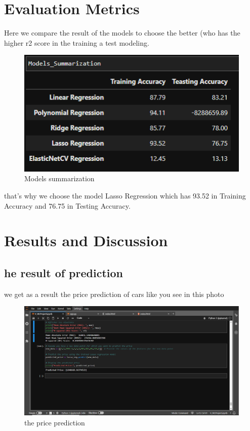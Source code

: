 \documentclass{article}
\begin{document}
\section{Evaluation Metrics}
Here we compare the result of the models to choose the better (who has the higher r2 score in the training a test modeling.

\begin{figure}[h]
    \centering
    \includegraphics[width=1\textwidth]{comparison.png}
    \caption{Models summarization}
    \label{fig:my_label}
\end{figure}

 that's why we choose the model Lasso Regression which has 93.52 in Training Accuracy and 76.75 in Testing Accuracy. 

\section{Results and Discussion}
\subsection{he result of prediction}
we get as a result the price prediction of cars like you see in this photo \\
\begin{figure}[h]
    \centering
    \includegraphics[width=1\textwidth]{result.png}
    \caption{the price prediction}
    \label{fig:my_label}
\end{figure}
\end{document}
